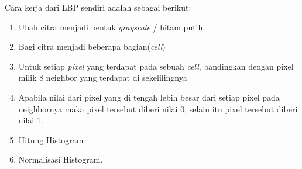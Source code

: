 \par Cara kerja dari LBP sendiri adalah sebagai berikut:
\begin{enumerate}
	\vspace{-2mm}
	\item Ubah citra menjadi bentuk \textit{grayscale} / hitam putih.
	\vspace{-2mm}
	\item Bagi citra menjadi beberapa bagian(\textit{cell})
	\vspace{-2mm}
	\item Untuk setiap \textit{pixel} yang terdapat pada sebuah \textit{cell}, bandingkan dengan pixel milik 8 neighbor yang terdapat di sekelilingnya
	\vspace{-2mm}
	\item Apabila nilai dari pixel yang di tengah lebih besar dari setiap pixel pada neighbornya maka pixel tersebut diberi nilai 0, selain itu pixel tersebut diberi nilai 1.
	\vspace{-2mm}
	\item Hitung Histogram
	\vspace{-2mm}
	\item Normalisasi Histogram.
\end{enumerate}

